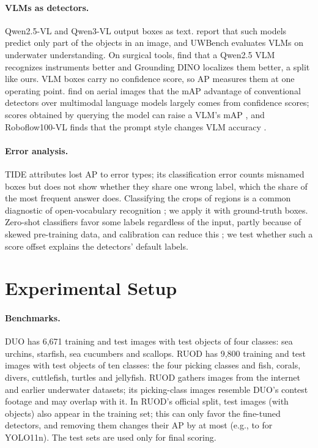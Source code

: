 \documentclass[letterpaper]{article} %
\begin{document}
\paragraph{VLMs as detectors.}
Qwen2.5-VL \citep{bai2025qwen25vl} and Qwen3-VL \citep{bai2025qwen3vl} output boxes as text. \citet{fu2026wedetect} report that such models predict only part of the objects in an image, and UWBench \citep{zhang2025uwbench} evaluates VLMs on underwater understanding. On surgical tools, \citet{poudel2026surgical} find that a Qwen2.5 VLM recognizes instruments better and Grounding DINO localizes them better, a split like ours. VLM boxes carry no confidence score, so AP measures them at one operating point. \citet{li2025aerialmlm} find on aerial images that the mAP advantage of conventional detectors over multimodal language models largely comes from confidence scores; scores obtained by querying the model can raise a VLM's mAP \citep{gare2026detpo}, and Roboflow100-VL finds that the prompt style changes VLM accuracy \citep{robicheaux2025rf100vl}.

\paragraph{Error analysis.}
TIDE \citep{bolya2020tide} attributes lost AP to error types; its classification error counts misnamed boxes but does not show whether they share one wrong label, which the share of the most frequent answer does. Classifying the crops of regions is a common diagnostic of open-vocabulary recognition \citep{gu2022vild}; we apply it with ground-truth boxes. Zero-shot classifiers favor some labels regardless of the input, partly because of skewed pre-training data, and calibration can reduce this \citep{zhao2021calibrate,zhu2023gla}; we test whether such a score offset explains the detectors' default labels.

\section{Experimental Setup}
\label{sec:setup}

\paragraph{Benchmarks.}
DUO \citep{liu2021duo} has 6,671 training and \nTestImages{} test images with \nTestObjects{} test objects of four classes: \nSeaUrchin{} sea urchins, \nStarfish{} starfish, \nSeaCucumber{} sea cucumbers and \nScallop{} scallops. RUOD \citep{fu2023ruod} has 9,800 training and \rTestImages{} test images with \rTestObjects{} test objects of ten classes: the four picking classes and fish, corals, divers, cuttlefish, turtles and jellyfish. RUOD gathers images from the internet and earlier underwater datasets; its picking-class images resemble DUO's contest footage and may overlap with it. In RUOD's official split, \rDupImages{} test images (with \rDupAnn{} objects) also appear in the training set; this can only favor the fine-tuned detectors, and removing them changes their AP by at most \rDedupMax{} (e.g., \rApYoloN{} to \rDedupYoloN{} for YOLO11n). The test sets are used only for final scoring.
\end{document}
